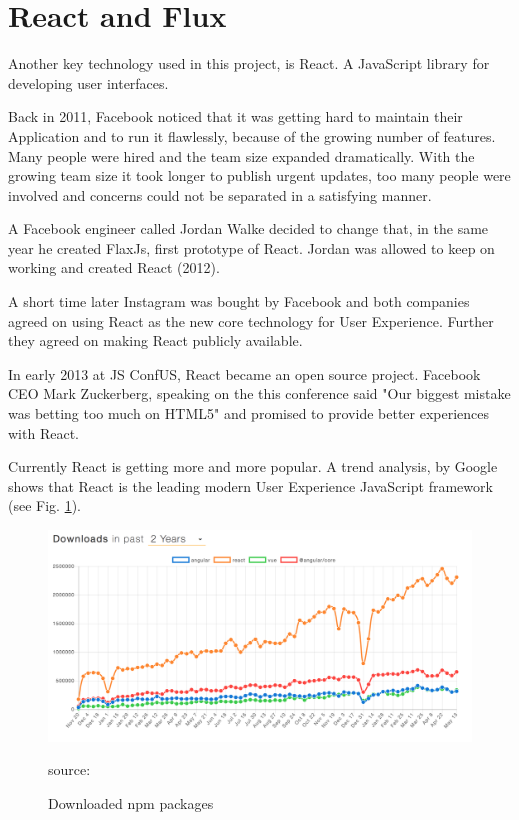 \section{React and Flux}

Another key technology used in this project, is React. A JavaScript library for developing user interfaces. \cite{React}

Back in 2011, Facebook noticed that it was getting hard to maintain their Application and to run it flawlessly, because of the growing number of features. Many people were hired and the team size expanded dramatically. With the growing team size it took longer to publish urgent updates, too many people were involved and concerns could not be separated in a satisfying manner.

A Facebook engineer called Jordan Walke decided to change that, in the same year he created FlaxJs, first prototype of React. Jordan was allowed to keep on working and created React (2012). 

A short time later Instagram was bought by Facebook and both companies agreed on using React as the new core technology for User Experience. Further they agreed on making React publicly available. 

In early 2013 at JS ConfUS, React became an open source project. Facebook CEO Mark Zuckerberg, speaking on the this conference said  "Our biggest mistake was betting too much on HTML5" and promised to provide better experiences with React.

Currently React is getting more and more popular. A trend analysis, by Google shows that React is the leading modern User Experience JavaScript framework (see Fig. \ref{fig:React}).

\begin{figure}[H]
	\centering
	\includegraphics[scale=0.4]{bilder/grundlagen/ReactDownloads.png}
	\caption{Downloaded npm packages} source: \cite{NPM}
	\label{fig:React}
\end{figure}

